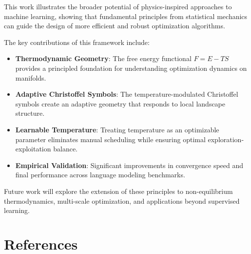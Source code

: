 \documentclass[12pt,a4paper]{article}
\begin{document}
This work illustrates the broader potential of physics-inspired approaches to machine learning, showing that fundamental principles from statistical mechanics can guide the design of more efficient and robust optimization algorithms.

The key contributions of this framework include:

\begin{itemize}[leftmargin=1cm]
\item \textbf{Thermodynamic Geometry}: The free energy functional $F = E - TS$ provides a principled foundation for understanding optimization dynamics on manifolds.

\item \textbf{Adaptive Christoffel Symbols}: The temperature-modulated Christoffel symbols create an adaptive geometry that responds to local landscape structure.

\item \textbf{Learnable Temperature}: Treating temperature as an optimizable parameter eliminates manual scheduling while ensuring optimal exploration-exploitation balance.

\item \textbf{Empirical Validation}: Significant improvements in convergence speed and final performance across language modeling benchmarks.
\end{itemize}

Future work will explore the extension of these principles to non-equilibrium thermodynamics, multi-scale optimization, and applications beyond supervised learning.

\vfill

\section*{References}
\end{document}
